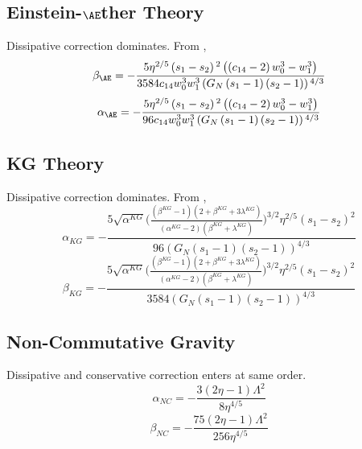 \documentclass[prd,twocolumn,nofootinbib]{revtex4-1}
\begin{document}
 
 
 \subsection{Einstein-$\AE$ther Theory}
 Dissipative correction dominates. From \cite{Hansen:2014ewa},
 \begin{equation}
 \beta_{\AE}=-\frac{5 \eta ^{2/5} \left(s_1-s_2\right){}^2 \left(\left(c_{14}-2\right) w_0^3-w_1^3\right)}{3584 c_{14} w_0^3 w_1^3 \left(\text{$G_N$} \left(s_1-1\right) \left(s_2-1\right)\right){}^{4/3}}
 \end{equation}
 \begin{equation}
 \alpha_{\AE}=-\frac{5 \eta ^{2/5} \left(s_1-s_2\right){}^2 \left(\left(c_{14}-2\right) w_0^3-w_1^3\right)}{96 c_{14} w_0^3 w_1^3 \left(\text{$G_N$} \left(s_1-1\right) \left(s_2-1\right)\right){}^{4/3}}
 \end{equation}
 
 \subsection{KG Theory}
 Dissipative correction dominates. From \cite{Hansen:2014ewa},
 \begin{equation}
 \alpha_{KG}=-\frac{5 \sqrt{\alpha^{KG}}\bigg(\frac{(\beta^{KG}-1)(2+\beta^{KG}+3\lambda^{KG})}{(\alpha^{KG}-2)(\beta^{KG}+\lambda^{KG})}\bigg)^{3/2}\eta ^{2/5} (\text{$s_1$}-\text{$s_2$})^2}{96 (\text{$G_N$} (\text{$s_1$}-1) (\text{$s_2$}-1))^{4/3}}
 \end{equation}
 \begin{equation}
 \beta_{KG}=-\frac{5 \sqrt{\alpha^{KG}}\bigg(\frac{(\beta^{KG}-1)(2+\beta^{KG}+3\lambda^{KG})}{(\alpha^{KG}-2)(\beta^{KG}+\lambda^{KG})}\bigg)^{3/2}\eta ^{2/5} (\text{$s_1$}-\text{$s_2$})^2}{3584(\text{$G_N$} (\text{$s_1$}-1) (\text{$s_2$}-1))^{4/3}}
 \end{equation}

 \subsection{Non-Commutative Gravity}
 Dissipative and conservative correction enters at same order. \cite{Kobakhidze:2016cqh}
 \begin{equation}
 \alpha_{NC}=-\frac{3 (2 \eta -1) \Lambda ^2}{8 \eta ^{4/5}}
 \end{equation}
 \begin{equation}
 \beta_{NC}=-\frac{75 (2 \eta -1) \Lambda ^2}{256 \eta ^{4/5}}
 \end{equation}
 \newpage
 
\end{document}
